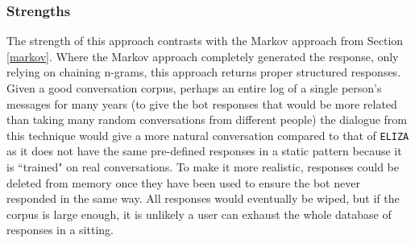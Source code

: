 \documentclass{article}
\newcommand{\n}[0]{\\[\baselineskip]}
\begin{document}
\subsubsection{Strengths}
The strength of this approach contrasts with the Markov approach from Section \ref{markov}. Where the Markov approach completely generated the response, only relying on chaining n-grams, this approach returns proper structured responses.
\n
Given a good conversation corpus, perhaps an entire log of a single person's messages for many years (to give the bot responses that would be more related than taking many random conversations from different people) the dialogue from this technique would give a more natural conversation compared to that of \texttt{ELIZA} as it does not have the same pre-defined responses in a static pattern because it is ``trained" on real conversations. To make it more realistic, responses could be deleted from memory once they have been used to ensure the bot never responded in the same way. All responses would eventually be wiped, but if the corpus is large enough, it is unlikely a user can exhaust the whole database of responses in a sitting.
\end{document}
